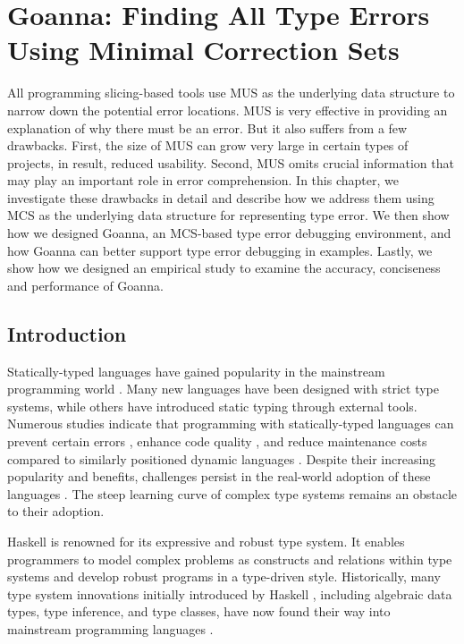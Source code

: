 
\chapter{Goanna: Finding All Type Errors Using Minimal Correction Sets} 

\label{chap:goanna} 
\graphicspath{{Figures/Goanna}}

All programming slicing-based tools use MUS as the underlying data structure to narrow down the potential error locations. MUS is very effective in providing an explanation of why there must be an error. But it also suffers from a few drawbacks. First, the size of MUS can grow very large in certain types of projects, in result, reduced usability. Second, MUS omits crucial information that may play an important role in error comprehension. In this chapter, we investigate these drawbacks in detail and describe how we address them using MCS as the underlying data structure for representing type error. We then show how we designed Goanna, an MCS-based type error debugging environment, and how Goanna can better support type error debugging in examples. Lastly, we show how we designed an empirical study to examine the accuracy, conciseness and performance of Goanna.


\section{Introduction} \label{sec:introduction}
    
Statically-typed languages have gained popularity in the mainstream programming world \cite{StackOverflow2022-aw}. Many new languages have been designed with strict type systems, while others have introduced static typing through external tools. Numerous studies indicate that programming with statically-typed languages can prevent certain errors \cite{Bogner2022-vf}, enhance code quality \cite{Mayer2012-lg}, and reduce maintenance costs \cite{Kleinschmager2012-bg} compared to similarly positioned dynamic languages \cite{Bogner2022-vf}. Despite their increasing popularity and benefits, challenges persist in the real-world adoption of these languages \cite{Zeng2019-ou}. The steep learning curve of complex type systems remains an obstacle to their adoption. 

Haskell is renowned for its expressive and robust type system. It enables programmers to model complex problems as constructs and relations within type systems and develop robust programs in a type-driven style. Historically, many type system innovations initially introduced by Haskell \cite{Hudak2007-kn}, including algebraic data types, type inference, and type classes, have now found their way into mainstream programming languages \cite{TypeScriptTeam_undated-qk,Klabnik_undated-mp,Griesemer_undated-ff}.
    

